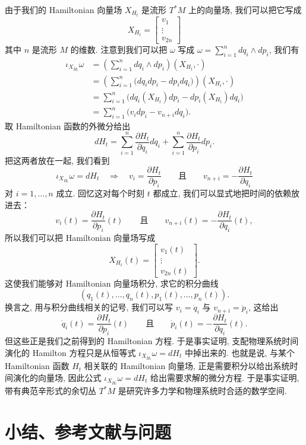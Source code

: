 由于我们的 Hamiltonian 向量场 $X_{H_t}$ 是流形 $T^*M$ 上的向量场, 我们可以把它写成
\[
X_{H_t}=\begin{bmatrix}v_1\\\vdots\\v_{2n}\end{bmatrix}
\]
其中 $n$ 是流形 $M$ 的维数. 注意到我们可以把 $\omega$ 写成 $\omega=\sum_{i=1}^{n}dq_i\wedge dp_i$, 我们有
\[
\begin{aligned}
\iota_{X_{H_t}}\omega&=\left(\sum_{i=1}^{n}dq_i\wedge dp_i\right)(X_{H_t},\cdot)\\
&=\left(\sum_{i=1}^{n}\bigl(dq_idp_i-dp_idq_i\bigr)\right)(X_{H_t},\cdot)\\
&=\sum_{i=1}^{n}\bigl(dq_i(X_{H_t})dp_i-dp_i(X_{H_t})dq_i\bigr)\\
&=\sum_{i=1}^{n}\bigl(v_idp_i-v_{n+i}dq_i\bigr).
\end{aligned}
\]
取 Hamiltonian 函数的外微分给出
\[
dH_t=\sum_{i=1}^{n}\frac{\partial H_t}{\partial q_i}dq_i+\sum_{i=1}^{n}\frac{\partial H_t}{\partial p_i}dp_i.
\]
把这两者放在一起, 我们看到
\[
\iota_{X_{H_t}}\omega=dH_t\quad\Rightarrow\quad v_i=\frac{\partial H_t}{\partial p_i}\qquad\text{且}\qquad v_{n+i}=-\frac{\partial H_t}{\partial q_i}
\]
对 $i=1,\ldots,n$ 成立. 回忆这对每个时刻 $t$ 都成立, 我们可以显式地把时间的依赖放进去：
\[
v_i(t)=\frac{\partial H_t}{\partial p_i}(t)\qquad\text{且}\qquad v_{n+i}(t)=-\frac{\partial H_t}{\partial q_i}(t),
\]
所以我们可以把 Hamiltonian 向量场写成
\[
X_{H_t}(t)=\begin{bmatrix}v_1(t)\\\vdots\\v_{2n}(t)\end{bmatrix}.
\]
这使我们能够对 Hamiltonian 向量场积分, 求它的积分曲线
\[
\left(q_1(t),\ldots,q_n(t),p_1(t),\ldots,p_n(t)\right).
\]
换言之, 用与积分曲线相关的记号, 我们可以写 $v_i=\dot{q}_i$ 与 $v_{n+i}=\dot{p}_i$, 这给出
\[
\dot{q}_i(t)=\frac{\partial H_t}{\partial p_i}(t)\qquad\text{且}\qquad\dot{p}_i(t)=-\frac{\partial H_t}{\partial q_i}(t).
\]
但这些正是我们之前得到的 Hamiltonian 方程. 于是事实证明, 支配物理系统时间演化的 Hamilton 方程只是从恒等式 $\iota_{X_{H_t}}\omega=dH_t$ 中掉出来的. 也就是说, 与某个 Hamiltonian 函数 $H_t$ 相关联的 Hamiltonian 向量场, 正是需要积分以给出系统时间演化的向量场, 因此公式 $\iota_{X_{H_t}}\omega=dH_t$ 给出需要求解的微分方程. 于是事实证明, 带有典范辛形式的余切丛 $T^*M$ 是研究许多力学和物理系统时合适的数学空间.

\section{小结、参考文献与问题}

